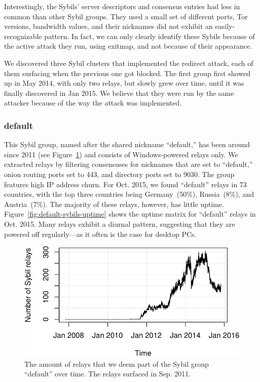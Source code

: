 Interestingly, the Sybils' server descriptors and consensus entries had less in
common than other Sybil groups.  They used a small set of different ports, Tor
versions, bandwidth values, and their nicknames did not exhibit an
easily-recognizable pattern.  In fact, we can only clearly identify these Sybils
because of the active attack they run, using exitmap, and not because of their
appearance.

We discovered three Sybil clusters that implemented the redirect attack, each of
them surfacing when the previous one got blocked.  The first group first showed
up in May 2014, with only two relays, but slowly grew over time, until it was
finally discovered in Jan 2015.  We believe that they were run by the same
attacker because of the way the attack was implemented.

\subsubsection{default}
\label{sec:default-sybils}
This Sybil group, named after the shared nickname ``default,'' has been around
since 2011 (see Figure~\ref{fig:default-over-time}) and consists of
Windows-powered relays only.  We extracted relays by filtering consensuses
for nicknames that are set to ``default,'' onion routing ports set to 443, and
directory ports set to 9030.  The group features high IP address churn.  For
Oct. 2015, we found ``default'' relays in 73 countries, with the top three
countries being Germany~(50\%), Russia~(8\%), and Austria~(7\%).  The majority
of these relays, however, has little uptime.
Figure~\ref{fig:default-sybils-uptime} shows the uptime matrix for ``default''
relays in Oct. 2015.  Many relays exhibit a diurnal pattern, suggesting
that they are powered off regularly---as it often is the case for desktop PCs.

\begin{figure}[t]
	\centering
	\includegraphics[width=\linewidth]{diagrams/default-over-time}
	\caption{The amount of relays that we deem part of the Sybil group
	``default'' over time.  The relays surfaced in Sep. 2011.}
	\label{fig:default-over-time}
\end{figure}

